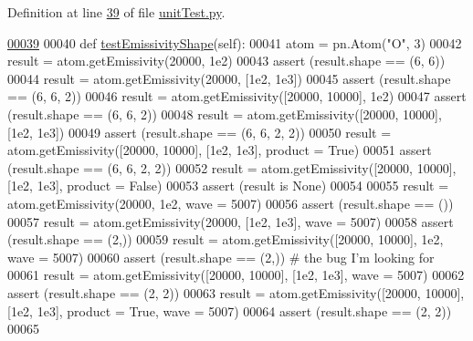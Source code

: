 Definition at line \hyperlink{unit_test_8py_source_l00039}{39} of file \hyperlink{unit_test_8py_source}{unit\-Test.\-py}.


\begin{DoxyCode}
\hypertarget{classpyneb_1_1test_1_1unit_test_1_1_unit_test_l00039}{}\hyperlink{classpyneb_1_1test_1_1unit_test_1_1_unit_test_ab20c505e3d6c94360bcf1bf5cdd4278d}{00039} 
00040         \textcolor{keyword}{def }\hyperlink{classpyneb_1_1test_1_1unit_test_1_1_unit_test_ab20c505e3d6c94360bcf1bf5cdd4278d}{testEmissivityShape}(self):
00041                 atom = pn.Atom(\textcolor{stringliteral}{"O"}, 3)
00042                 result = atom.getEmissivity(20000, 1e2)
00043                 \textcolor{keyword}{assert} (result.shape == (6, 6))
00044                 result = atom.getEmissivity(20000, [1e2, 1e3])
00045                 \textcolor{keyword}{assert} (result.shape == (6, 6, 2))
00046                 result = atom.getEmissivity([20000, 10000], 1e2)
00047                 \textcolor{keyword}{assert} (result.shape == (6, 6, 2))
00048                 result = atom.getEmissivity([20000, 10000], [1e2, 1e3])         
00049                 \textcolor{keyword}{assert} (result.shape == (6, 6, 2, 2))
00050                 result = atom.getEmissivity([20000, 10000], [1e2, 1e3], product = \textcolor{keyword}{True})         
00051                 \textcolor{keyword}{assert} (result.shape == (6, 6, 2, 2))
00052                 result = atom.getEmissivity([20000, 10000], [1e2, 1e3], product = \textcolor{keyword}{False})                
00053                 \textcolor{keyword}{assert} (result \textcolor{keywordflow}{is} \textcolor{keywordtype}{None})
00054                 
00055                 result = atom.getEmissivity(20000, 1e2, wave = 5007)
00056                 \textcolor{keyword}{assert} (result.shape == ())
00057                 result = atom.getEmissivity(20000, [1e2, 1e3], wave = 5007)
00058                 \textcolor{keyword}{assert} (result.shape == (2,))
00059                 result = atom.getEmissivity([20000, 10000], 1e2, wave = 5007)
00060                 \textcolor{keyword}{assert} (result.shape == (2,)) \textcolor{comment}{# the bug I'm looking for}
00061                 result = atom.getEmissivity([20000, 10000], [1e2, 1e3], wave = 5007)            
00062                 \textcolor{keyword}{assert} (result.shape == (2, 2))
00063                 result = atom.getEmissivity([20000, 10000], [1e2, 1e3], product = \textcolor{keyword}{True}, wave = 5007)            
00064                 \textcolor{keyword}{assert} (result.shape == (2, 2))
00065                 

\end{DoxyCode}
